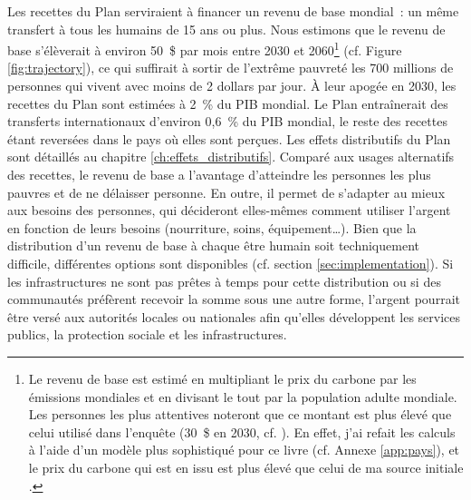 \documentclass[a5paper,french,openany]{memoir}
\begin{document}
Les recettes du Plan serviraient à financer un revenu de base mondial~: un même transfert à tous les humains de 15 ans ou plus. Nous estimons que le revenu de base s'élèverait à environ 50~\$ par mois entre 2030 et 2060\footnote{Le revenu de base est estimé en multipliant le prix du carbone par les émissions mondiales et en divisant le tout par la population adulte mondiale. Les personnes les plus attentives noteront que ce montant est plus élevé que celui utilisé dans l'enquête (30~\$ en 2030, cf. \citealp{fabre_global_2023}). En effet, j'ai refait les calculs à l'aide d'un modèle plus sophistiqué pour ce livre (cf. Annexe \ref{app:pays}), et le prix du carbone qui est en issu est plus élevé que celui de ma source initiale \citep{stern_report_2017}.} (cf. Figure \ref{fig:trajectory}), 
ce qui suffirait à sortir de l'extrême pauvreté les 700 millions de personnes qui vivent avec moins de 2 dollars par jour. À leur apogée en 2030, les recettes du Plan sont estimées à 2~\% du PIB mondial. Le Plan entraînerait des transferts internationaux d'environ 0,6~\% %
du PIB mondial, le reste %
des recettes étant reversées dans le pays où elles sont perçues. Les effets distributifs du Plan sont détaillés au chapitre \ref{ch:effets_distributifs}. %
Comparé aux usages alternatifs des recettes, le revenu de base a l'avantage d'atteindre les personnes les plus pauvres et de ne délaisser personne. En outre, il permet de s'adapter au mieux aux besoins des personnes, qui décideront elles-mêmes comment utiliser l'argent en fonction de leurs besoins (nourriture, soins, équipement\dots{}). 
Bien que la distribution d'un revenu de base à chaque être humain soit techniquement difficile, différentes options sont disponibles %
(cf. section \ref{sec:implementation}). Si les infrastructures ne sont pas prêtes à temps pour cette distribution ou si des communautés préfèrent recevoir la somme sous une autre forme, l'argent pourrait être versé aux autorités locales ou nationales afin qu'elles développent les services publics, la protection sociale et les infrastructures. 
\end{document}
